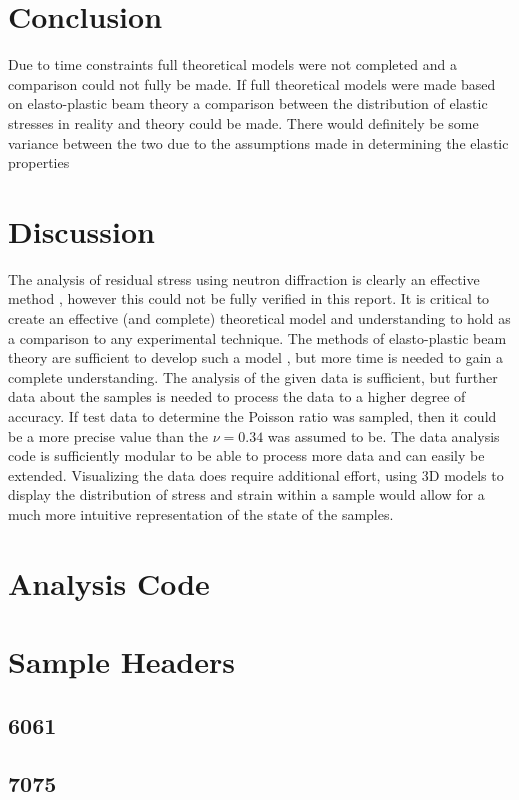 \documentclass[11pt, oneside]{article}   	%
\begin{document}
\section{Conclusion}
Due to time constraints full theoretical models were not completed and a comparison could not fully be made. If full theoretical models were made based on elasto-plastic beam theory a comparison between the distribution of elastic stresses in reality and theory could be made. There would definitely be some variance between the two due to the assumptions made in determining the elastic properties
\section{Discussion}
The analysis of residual stress using neutron diffraction is clearly an effective method \cite{Diffraction_Xray} \cite{MeasurementConference}, however this could not be fully verified in this report. It is critical to create an effective (and complete) theoretical model and understanding to hold as a comparison to any experimental technique. The methods of elasto-plastic beam theory are sufficient to develop such a model \cite{LecturesWensrich}, but more time is needed to gain a complete understanding.
The analysis of the given data is sufficient, but further data about the samples is needed to process the data to a higher degree of accuracy. If test data to determine the Poisson ratio was sampled, then it could be a more precise value than the $\nu=0.34$ \cite{Handout} was assumed to be. The data analysis code is sufficiently modular to be able to process more data and can easily be extended.
Visualizing the data does require additional effort, using 3D models to display the distribution of stress and strain within a sample would allow for a much more intuitive representation of the state of the samples.


\appendix
\section{Analysis Code}

\section{Sample Headers}
\subsection{6061}

\subsection{7075}

\end{document}
